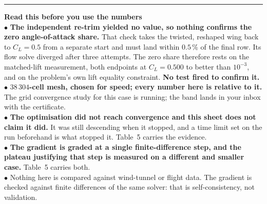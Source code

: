 \documentclass[9pt,a4paper]{article}
\renewcommand{\footnotesize}{\fontsize{6.4}{6.85}\selectfont}
\begin{document}
\vspace{3pt}
{\color{rulegrey}\rule{\textwidth}{0.5pt}}
\vspace{2pt}

\begin{minipage}[t]{0.545\textwidth}
\colorbox{boxgrey}{\begin{minipage}[t]{0.972\textwidth}
{\footnotesize\textbf{Read this before you use the numbers}\\[1pt]
$\bullet$ \textbf{The independent re-trim yielded no value, so nothing confirms
the zero angle-of-attack share.} That check takes the twisted, reshaped wing
back to $C_L=0.5$ from a separate start and must land within $0.5\,\%$ of the
final row. Its flow solve diverged after three attempts. The zero share
therefore rests on the matched-lift measurement, both endpoints at $C_L=0.500$
to better than $10^{-3}$, and on the problem's own lift equality constraint.
\textbf{No test fired to confirm it.}\\
$\bullet$ \textbf{$38\,304$-cell mesh, chosen for speed; every number here is
relative to it.} The grid convergence study for this case is running; the band
lands in your inbox with the certificate.\\
$\bullet$ \textbf{The optimisation did not reach convergence and this sheet
does not claim it did.} It was still descending when it stopped, and a time limit
set on the run beforehand is what stopped it. Table~5 carries the evidence.\\
$\bullet$ \textbf{The gradient is graded at a single finite-difference step,
and the plateau justifying that step is measured on a different and smaller
case.} Table~5 carries both.\\
$\bullet$ Nothing here is compared against wind-tunnel or flight data. The
gradient is checked against finite differences of the same solver: that is
self-consistency, not validation.}
\end{minipage}}
\end{minipage}\hfill
\end{document}
